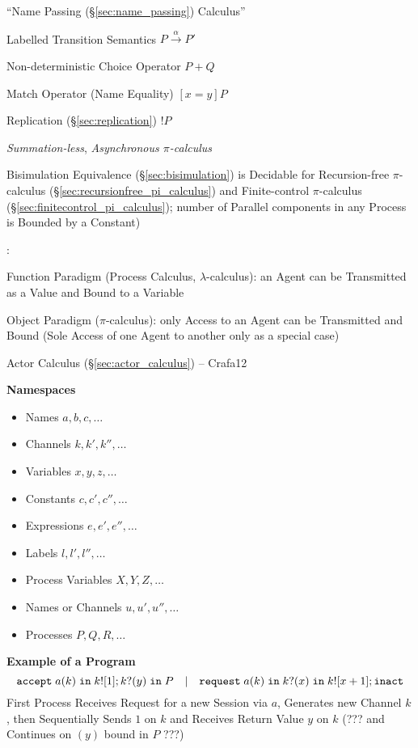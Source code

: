 ``Name Passing (\S\ref{sec:name_passing}) Calculus''

Labelled Transition Semantics $P \xrightarrow{\alpha} P'$

Non-deterministic Choice Operator $P + Q$

Match Operator (Name Equality) $[x=y]P$

Replication (\S\ref{sec:replication}) $!P$

\emph{Summation-less}, \emph{Asynchronous
  $\pi$-calculus} %
\cite{honda-vasconcelos-kubo98}

Bisimulation Equivalence (\S\ref{sec:bisimulation}) is Decidable for
Recursion-free $\pi$-calculus (\S\ref{sec:recursionfree_pi_calculus})
and Finite-control $\pi$-calculus
(\S\ref{sec:finitecontrol_pi_calculus}); number of Parallel components
in any Process is Bounded by a Constant)

\cite{milner92}:

Function Paradigm (Process Calculus, $\lambda$-calculus): an Agent can
be Transmitted as a Value and Bound to a Variable

Object Paradigm ($\pi$-calculus): only Access to an Agent can be
Transmitted and Bound (Sole Access of one Agent to another only as a
special case)

\fist Actor Calculus (\S\ref{sec:actor_calculus}) -- Crafa12


\asterism


\textbf{Namespaces} \cite{honda-vasconcelos-kubo98}

\begin{itemize}
\item Names $a,b,c,\ldots$
\item Channels $k,k',k'',\ldots$
\item Variables $x,y,z,\ldots$
\item Constants $c,c',c'',\ldots$
\item Expressions $e,e',e'',\ldots$
\item Labels $l,l',l'',\ldots$
\item Process Variables $X,Y,Z,\ldots$
\item Names or Channels $u, u', u'', \ldots$
\item Processes $P,Q,R, \ldots$
\end{itemize}


\textbf{Example of a Program} \cite{honda-vasconcelos-kubo98}
\[
  \mathtt{accept} \; a(k) \; \mathtt{in} \; k![1];
  k?(y) \; \mathtt{in} \; P
  \quad | \quad
  \mathtt{request} \; a(k) \; \mathtt{in} \; k?(x)
  \; \mathtt{in} \; k![x+1]; \mathtt{inact}
\]
First Process Receives Request for a new Session via $a$, Generates
new Channel $k$, then Sequentially Sends $1$ on $k$ and Receives
Return Value $y$ on $k$ (??? and Continues on $(y)$ bound in $P$ ???)

